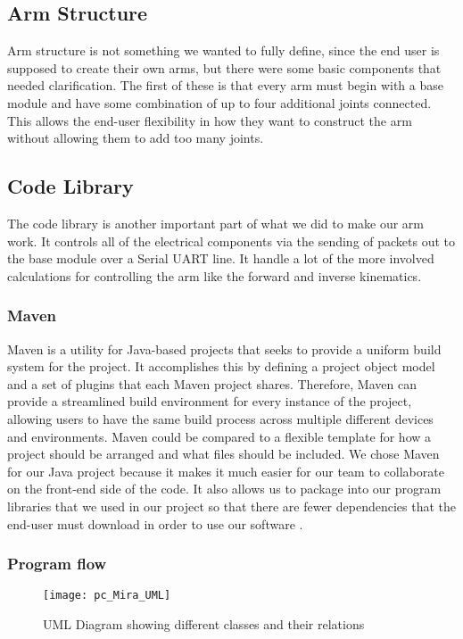 \subsection{Arm Structure}
Arm structure is not something we wanted to fully define, since the end user is supposed to create their own arms, but there were some basic components that needed clarification. The first of these is that every arm must begin with a base module and have some combination of up to four additional joints connected.  This allows the end-user flexibility in how they want to construct the arm without allowing them to add too many joints.


\subsection{Code Library}
The code library is another important part of what we did to make our arm work. It controls all of the electrical components via the sending of packets out to the base module over a Serial UART line. It handle a lot of the more involved calculations for controlling the arm like the forward and inverse kinematics.  


\subsubsection{Maven}
Maven is a utility for Java-based projects that seeks to provide a uniform build system for the project. It accomplishes this by defining a project object model and a set of plugins that each Maven project shares. Therefore, Maven can provide a streamlined build environment for every instance of the project, allowing users to have the same build process across multiple different devices and environments. Maven could be compared to a flexible template for how a project should be arranged and what files should be included. We chose Maven for our Java project because it makes it much easier for our team to collaborate on the front-end side of the code.  It also allows us to package into our program libraries that we used in our project so that there are fewer dependencies that the end-user must download in order to use our software \cite{maven}.


\subsubsection{Program flow}

\begin{figure}[H]
\centering
\texttt{[image: pc\_Mira\_UML]}
\caption{UML Diagram showing different classes and their relations}
\label{fig:Functional_Block_Diagram}
\end{figure}

